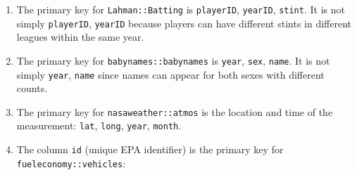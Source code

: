 \documentclass[]{book}
\newenvironment{Shaded}{\begin{snugshade}}{\end{snugshade}}
\newcommand{\CommentTok}[1]{\textcolor[rgb]{0.56,0.35,0.01}{\textit{#1}}}
\newcommand{\DecValTok}[1]{\textcolor[rgb]{0.00,0.00,0.81}{#1}}
\newcommand{\KeywordTok}[1]{\textcolor[rgb]{0.13,0.29,0.53}{\textbf{#1}}}
\newcommand{\NormalTok}[1]{#1}
\newcommand{\OperatorTok}[1]{\textcolor[rgb]{0.81,0.36,0.00}{\textbf{#1}}}
\newcommand{\StringTok}[1]{\textcolor[rgb]{0.31,0.60,0.02}{#1}}
\theoremstyle{plain}
\theoremstyle{remark}
\theoremstyle{definition}
\theoremstyle{definition}
\theoremstyle{definition}
\theoremstyle{remark}
\begin{document}
\begin{enumerate}
\def\labelenumi{\arabic{enumi}.}
\item
  The primary key for \texttt{Lahman::Batting} is \texttt{playerID},
  \texttt{yearID}, \texttt{stint}. It is not simply \texttt{playerID},
  \texttt{yearID} because players can have different stints in different
  leagues within the same year.

\begin{Shaded}
\end{Shaded}
\item
  The primary key for \texttt{babynames::babynames} is \texttt{year},
  \texttt{sex}, \texttt{name}. It is not simply \texttt{year},
  \texttt{name} since names can appear for both sexes with different
  counts.

\begin{Shaded}
\end{Shaded}
\item
  The primary key for \texttt{nasaweather::atmos} is the location and
  time of the measurement: \texttt{lat}, \texttt{long}, \texttt{year},
  \texttt{month}.

\begin{Shaded}
\end{Shaded}
\item
  The column \texttt{id} (unique EPA identifier) is the primary key for
  \texttt{fueleconomy::vehicles}:


\end{enumerate}
\end{document}
